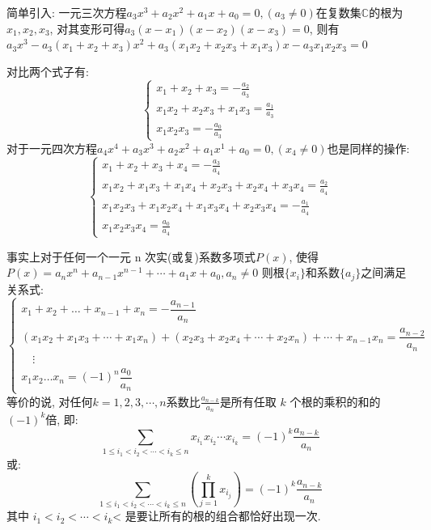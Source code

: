 \documentclass{book}
\begin{document}
        简单引入: 一元三次方程$a_3x^3+a_2x^2+a_1x+a_0=0,(a_3\neq0)$在复数集$\mathbb{C}$的根为$x_1,x_2,x_3$, 对其变形可得$a_3(x-x_1)(x-x_2)(x-x_3)=0$, 则有$a_3x^3-a_3(x_1+x_2+x_3)x^2+a_3(x_1x_2+x_2x_3+x_1x_3)x-a_3x_1x_2x_3=0$

        \textcolor[rgb]{0.75,0.17,0.22}{对比两个式子}有:
        $$
        \left\{\begin{matrix} 
            \displaystyle x_1+x_2+x_3=-\frac{a_2}{a_3}  \\  
            \displaystyle x_1x_2+x_2x_3+x_1x_3=\frac{a_1}{a_3} \\
            \displaystyle x_1x_2x_3=-\frac{a_0}{a_3} 
          \end{matrix}\right. 
        $$
        对于一元四次方程$a_4x^4+a_3x^3+a_2x^2+a_1x^1+a_0=0,\left( x_4 \neq 0 \right)$也是同样的操作:
        $$
        \left\{\begin{matrix} 
            \displaystyle x_1+x_2+x_3+x_4=-\frac{a_3}{a_4} \\  
            \displaystyle x_1x_2+x_1x_3+x_1x_4+x_2x_3+x_2x_4+x_3x_4=\frac{a_2}{a_4} \\
            \displaystyle x_1x_2x_3+x_1x_2x_4+x_1x_3x_4+x_2x_3x_4=-\frac{a_1}{a_4} \\
            \displaystyle x_1x_2x_3x_4=\frac{a_0}{a_4} 
          \end{matrix}\right. 
        $$

        事实上对于任何一个一元 n 次实(或复)系数多项式$P(x)$, 使得$P(x)=a_nx^n  + a_{n-1}x^{n-1} +\cdots + a_1 x+ a_0,a_n\neq 0$
        则根${\displaystyle \{x_{i}\}}$和系数${\displaystyle \{a_{j}\}}$之间满足关系式:
        $$
        \begin{cases} x_1 + x_2 + \dots + x_{n-1} + x_n = -\dfrac{a_{n-1}}{a_{n}} \\ 
            (x_1 x_2 + x_1 x_3+\cdots + x_1 x_n) + (x_2x_3 + x_2x_4+\cdots + x_2x_n)+\cdots + x_{n-1}x_n = \dfrac{a_{n-2}}{a_{n}} \\
            {} \quad \vdots \\ x_1 x_2 \dots x_n = (-1)^n \dfrac{a_0}{a_n}
        \end{cases}
        $$
        等价的说, 对任何$k=1,2,3,\cdots,n$系数比${\displaystyle {\frac {a_{n-k}}{a_{n}}}}$是所有任取 $k$ 个根的乘积的和的${\displaystyle (-1)^{k}}$倍, 即:
        $$\sum_{1\le i_1 < i_2 < \cdots < i_k\le n} x_{i_1}x_{i_2}\cdots x_{i_k}=(-1)^k\frac{a_{n-k}}{a_n}$$
        或:
        $$\sum_{1\le i_1 < i_2 < \cdots < i_k\le n} \left(\prod_{j = 1}^k x_{i_j}\right)=(-1)^k\frac{a_{n-k}}{a_n}$$
        其中 $i_1 < i_2 < \cdots < i_k$< 是要让所有的根的组合都恰好出现一次. 
\end{document}
